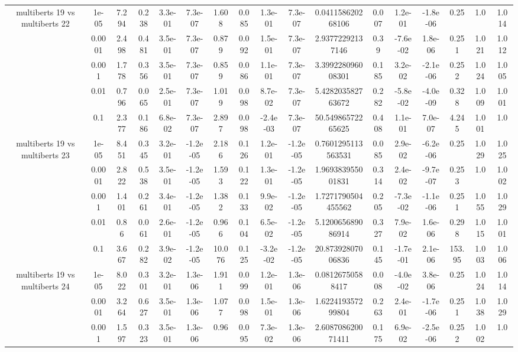 \begin{tabular}{|c|c|c|c|c|c|c|c|c|c|c|c|c|c|c|c|c|}
\hline
\multirow{5}{*}{multiberts 19 vs multiberts 22} & 1e-05 & 7.294 & 0.238 & 3.3e-01 & 7.3e-07 & 1.608 & 0.085 & 1.3e-01 & 7.3e-07 & 0.041158620268106 & 0.007 & 1.2e-01 & -1.8e-06 & 0.25 & 1.0 & 1.014 \\
 & 0.0001 & 2.498 & 0.481 & 3.5e-01 & 7.3e-07 & 0.879 & 0.092 & 1.5e-01 & 7.3e-07 & 2.93772292137146 & 0.39 & -7.6e-02 & 1.8e-06 & 0.251 & 1.021 & 1.012 \\
 & 0.001 & 1.778 & 0.356 & 3.5e-01 & 7.3e-07 & 0.859 & 0.086 & 1.1e-01 & 7.3e-07 & 3.399228096008301 & 0.185 & 3.2e-02 & -2.1e-06 & 0.252 & 1.024 & 1.005 \\
 & 0.01 & 0.796 & 0.065 & 2.5e-01 & 7.3e-07 & 1.019 & 0.098 & 8.7e-02 & 7.3e-07 & 5.428203582763672 & 0.282 & -5.8e-02 & -4.0e-09 & 0.328 & 1.009 & 1.001 \\
 & 0.1 & 2.377 & 0.186 & 6.8e-02 & 7.3e-07 & 2.897 & 0.098 & -2.4e-03 & 7.3e-07 & 50.54986572265625 & 0.408 & 1.1e-01 & 7.0e-07 & 4.245 & 1.001 & 1.0 \\
\hline
\multirow{5}{*}{multiberts 19 vs multiberts 23} & 1e-05 & 8.451 & 0.345 & 3.2e-01 & -1.2e-05 & 2.186 & 0.126 & 1.2e-01 & -1.2e-05 & 0.7601295113563531 & 0.085 & 2.9e-02 & -6.2e-06 & 0.25 & 1.029 & 1.025 \\
 & 0.0001 & 2.822 & 0.538 & 3.5e-01 & -1.2e-05 & 1.593 & 0.122 & 1.3e-01 & -1.2e-05 & 1.969383955001831 & 0.314 & 2.4e-02 & -9.7e-07 & 0.253 & 1.0 & 1.002 \\
 & 0.001 & 1.401 & 0.261 & 3.4e-01 & -1.2e-05 & 1.382 & 0.133 & 9.9e-02 & -1.2e-05 & 1.7271790504455562 & 0.205 & -7.3e-02 & -1.1e-06 & 0.251 & 1.055 & 1.029 \\
 & 0.01 & 0.86 & 0.061 & 2.6e-01 & -1.2e-05 & 0.966 & 0.104 & 6.5e-02 & -1.2e-05 & 5.120065689086914 & 0.327 & 7.9e-02 & 1.6e-06 & 0.298 & 1.015 & 1.001 \\
 & 0.1 & 3.667 & 0.282 & 3.9e-02 & -1.2e-05 & 10.076 & 0.125 & -3.2e-02 & -1.2e-05 & 20.87392807006836 & 0.145 & -1.7e-01 & 2.1e-06 & 153.95 & 1.003 & 1.006 \\
\hline
\multirow{5}{*}{multiberts 19 vs multiberts 24} & 1e-05 & 8.022 & 0.301 & 3.2e-01 & 1.3e-06 & 1.911 & 0.099 & 1.2e-01 & 1.3e-06 & 0.08126750588417 & 0.008 & -4.0e-02 & 3.8e-06 & 0.25 & 1.024 & 1.014 \\
 & 0.0001 & 3.264 & 0.627 & 3.5e-01 & 1.3e-06 & 1.077 & 0.098 & 1.5e-01 & 1.3e-06 & 1.622419357299804 & 0.263 & 2.4e-01 & -1.7e-06 & 0.251 & 1.038 & 1.029 \\
 & 0.001 & 1.597 & 0.323 & 3.5e-01 & 1.3e-06 & 0.96 & 0.095 & 7.3e-02 & 1.3e-06 & 2.608708620071411 & 0.175 & 6.9e-02 & -2.5e-06 & 0.252 & 1.002 & 1.0 \\

\end{tabular}
